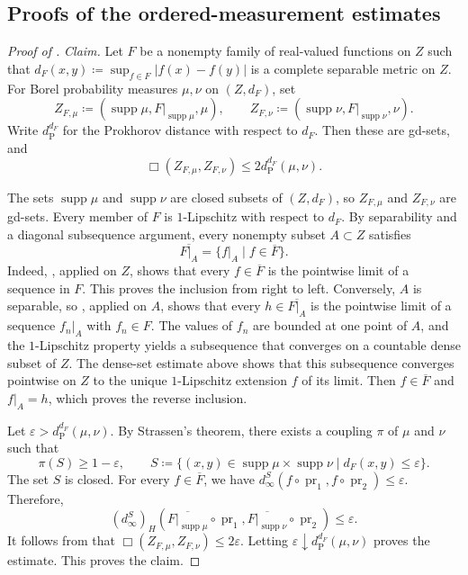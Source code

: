 \documentclass{amsart}
\theoremstyle{plain}
\theoremstyle{definition}
\theoremstyle{remark}
\DeclareMathOperator{\supp}{supp}
\DeclareMathOperator{\pr}{pr}
\newcommand{\dinf}[1]{d^{#1}_{\infty}}
\newcommand{\haus}[1]{\left(#1\right)_H}
\begin{document}
\subsection{Proofs of the ordered-measurement estimates}
\label{subsec:appendix-ordered-measurement-proofs}

\begin{proof}[Proof of ]
\emph{Claim.} Let $F$ be a nonempty family of real-valued functions on $Z$ such that $d_F(x,y)\coloneqq\sup_{f\in F}|f(x)-f(y)|$ is a complete separable metric on $Z$. For Borel probability measures $\mu,\nu$ on $(Z,d_F)$, set
\[
Z_{F,\mu}\coloneqq(\supp\mu,F|_{\supp\mu},\mu),\qquad Z_{F,\nu}\coloneqq(\supp\nu,F|_{\supp\nu},\nu).
\]
Write $d_{\operatorname P}^{d_F}$ for the Prokhorov distance with respect to $d_F$. Then these are gd-sets, and
\[\Box(Z_{F,\mu},Z_{F,\nu})\leq2d_{\operatorname P}^{d_F}(\mu,\nu).\]

The sets $\supp\mu$ and $\supp\nu$ are closed subsets of $(Z,d_F)$, so $Z_{F,\mu}$ and $Z_{F,\nu}$ are gd-sets. Every member of $F$ is $1$-Lipschitz with respect to $d_F$. By separability and a diagonal subsequence argument, every nonempty subset $A\subset Z$ satisfies
\[\overline{F|_A}=\{f|_A\mid f\in\overline F\}.\]
Indeed, , applied on $Z$, shows that every $f\in\overline F$ is the pointwise limit of a sequence in $F$. This proves the inclusion from right to left. Conversely, $A$ is separable, so , applied on $A$, shows that every $h\in\overline{F|_A}$ is the pointwise limit of a sequence $f_n|_A$ with $f_n\in F$. The values of $f_n$ are bounded at one point of $A$, and the $1$-Lipschitz property yields a subsequence that converges on a countable dense subset of $Z$. The dense-set estimate above shows that this subsequence converges pointwise on $Z$ to the unique $1$-Lipschitz extension $f$ of its limit. Then $f\in\overline F$ and $f|_A=h$, which proves the reverse inclusion.

Let $\varepsilon>d_{\operatorname P}^{d_F}(\mu,\nu)$. By Strassen's theorem, there exists a coupling $\pi$ of $\mu$ and $\nu$ such that
\[
\pi(S)\geq1-\varepsilon,\qquad S\coloneqq\{(x,y)\in\supp\mu\times\supp\nu\mid d_F(x,y)\leq\varepsilon\}.
\]
The set $S$ is closed. For every $f\in\overline F$, we have $\dinf{S}(f\circ\pr_1,f\circ\pr_2)\leq\varepsilon$. Therefore,
\[
\haus{\dinf{S}}(\overline{F|_{\supp\mu}}\circ\pr_1,\overline{F|_{\supp\nu}}\circ\pr_2)\leq\varepsilon.
\]
It follows from  that $\Box(Z_{F,\mu},Z_{F,\nu})\leq2\varepsilon$. Letting $\varepsilon\downarrow d_{\operatorname P}^{d_F}(\mu,\nu)$ proves the estimate. This proves the claim.


\end{proof}
\end{document}
